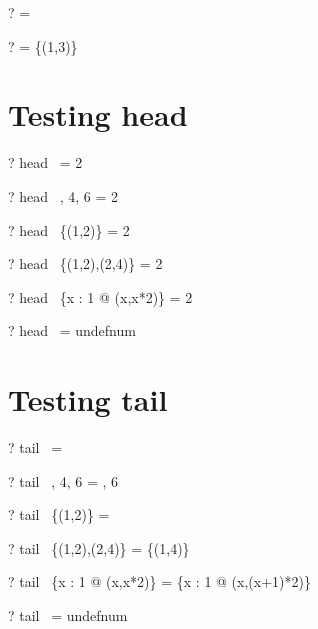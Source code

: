 \documentclass{article}
\begin{document}
\begin{zed} \vdash? \langle \rangle = \emptyset \end{zed}
\begin{zed} \vdash?  \rangle = \{(1,3)\} \end{zed}

\section{Testing head}
\begin{zed} \vdash? head~  \rangle = 2 \end{zed}
\begin{zed} \vdash? head~ , 4, 6 \rangle = 2 \end{zed}
\begin{zed} \vdash? head~ \{(1,2)\} = 2 \end{zed}
\begin{zed} \vdash? head~ \{(1,2),(2,4)\} = 2 \end{zed}
\begin{zed} \vdash? head~ \{x : 1  @ (x,x*2)\} = 2 \end{zed}
\begin{zed} \vdash? head~ \langle \rangle = undefnum \end{zed}

\section{Testing tail}
\begin{zed} \vdash? tail~  \rangle = \emptyset \end{zed}
\begin{zed} \vdash? tail~ , 4, 6 \rangle = , 6 \rangle \end{zed}
\begin{zed} \vdash? tail~ \{(1,2)\} = \emptyset \end{zed}
\begin{zed} \vdash? tail~ \{(1,2),(2,4)\} = \{(1,4)\} \end{zed}
\begin{zed} \vdash? tail~ \{x : 1  @ (x,x*2)\} = \{x : 1  @ (x,(x+1)*2)\} \end{zed}
\begin{zed} \vdash? tail~ \langle \rangle = undefnum \end{zed}
\end{document}
